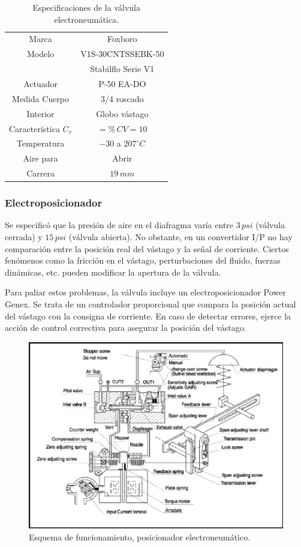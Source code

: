 \begin{table}[ht]
\renewcommand{\arraystretch}{1.3}
\centering
 \begin{tabular}{|c|c|}
  \hline
  Marca & Foxboro\\
  Modelo & V1S-30CNTSSEBK-50\\
	& Stabilflo Serie V1\\
 Actuador & P-50 EA-DO\\
 Medida Cuerpo & 3/4 roscado\\
 Interior & Globo vástago\\
 Característica $C_v$ & $=\%\,CV=10$\\
 Temperatura & $-30$ a $207^\circ C$\\
 Aire para & Abrir  \\
 Carrera & $19\,mm$ \\
  \hline
 \end{tabular}
 \caption{Especificaciones de la válvula electroneumática.}
 \label{tab:especifValvs}
\end{table}

\subsubsection{Electroposicionador}
Se especificó que la presión de aire en el diafragma varía entre $3\,psi$
(válvula cerrada) y $15\,psi$ (válvula abierta).
No obstante, en un convertidor I/P no hay comparación entre
la posición real del vástago y la señal de corriente.
Ciertos fenómenos como la fricción en el vástago, perturbaciones del fluido,
fuerzas dinámicas, etc. pueden modificar la apertura de la válvula.

Para paliar estos problemas, la válvula incluye un electroposicionador Power
Genex.
Se trata de un controlador proporcional que compara la posición actual del
vástago con la consigna de corriente.
En caso de detectar errores, ejerce la acción de control correctiva para
asegurar la posición del vástago.

\begin{figure}[ht]
 \centering
 \includegraphics[scale=1.1]{Cap2-DisenoEnsamblado/images/PG-EPL.pdf}
 \caption{Esquema de funcionamiento, posicionador electroneumático.}
 \label{fig:elp-funcionamiento}
\end{figure}

